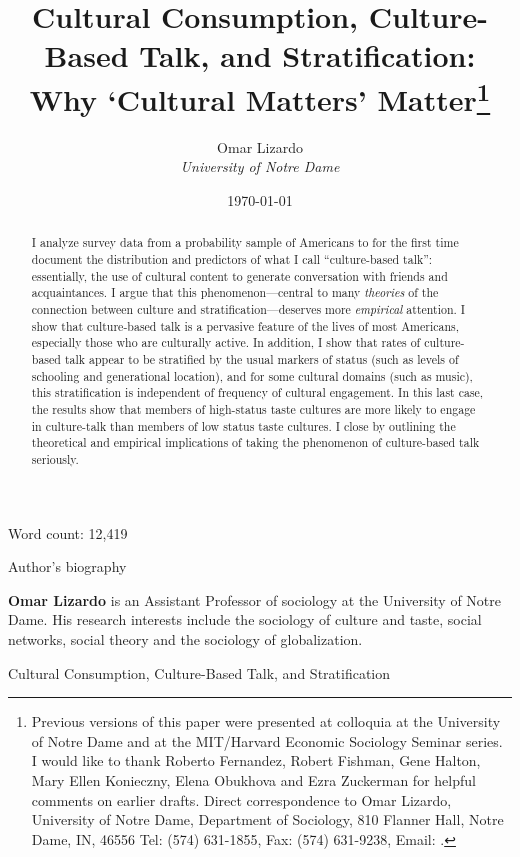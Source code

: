 \documentclass[11pt]{article}
\begin{document}
\title{Cultural Consumption, Culture-Based Talk, and Stratification:  Why `Cultural Matters' Matter\footnote{Previous versions of this paper were presented at colloquia at the University of Notre Dame and at the MIT/Harvard Economic Sociology Seminar series. I would like to thank Roberto Fernandez, Robert Fishman, Gene Halton, Mary Ellen Konieczny, Elena Obukhova and Ezra Zuckerman for helpful comments on earlier drafts.  Direct correspondence to Omar Lizardo, University of Notre Dame, Department of Sociology, 810 Flanner Hall, Notre Dame, IN, 46556  Tel: (574) 631-1855, Fax: (574) 631-9238, Email: .}}

\author{Omar Lizardo \\ \textit{University of Notre Dame}}


\date{\today}


\maketitle

\begin{center}
	Word count:  12,419
\end{center}

\newpage
\begin{center}
	{\large Author's biography}
\end{center}
{\bf Omar Lizardo} is an Assistant Professor of sociology at the University of Notre Dame.  His research interests include the sociology of culture and taste, social networks, social theory and the sociology of globalization.

\newpage
\begin{center}
	{\large Cultural Consumption, Culture-Based Talk, and Stratification}
\end{center}
\begin{abstract}
\small I analyze survey data from a probability sample of Americans to  for the first time document the distribution and predictors of what I call ``culture-based talk'': essentially, the use of cultural content to generate conversation with friends and acquaintances.  I argue that this phenomenon---central to many \emph{theories} of the connection between culture and stratification---deserves more \emph{empirical} attention. I show that culture-based talk is a pervasive feature of the lives of most Americans, especially those who are culturally active. In addition, I show that rates of culture-based talk appear to be stratified by the usual markers of status (such as levels of schooling and generational location), and for some cultural domains (such as music), this stratification is independent of frequency of cultural engagement.  In this last case, the results show that members of high-status taste cultures are more likely to engage in culture-talk than members of low status taste cultures.  I close by outlining the theoretical and empirical implications of taking the phenomenon of culture-based talk seriously. 
\end{abstract}
\end{document}
